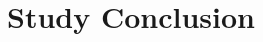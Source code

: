 %
%
%
%
%
%








%
%




    
    




\clearpage
\section{Study Conclusion}  \label{EvaluationInCSDL:StudyConclusion}

